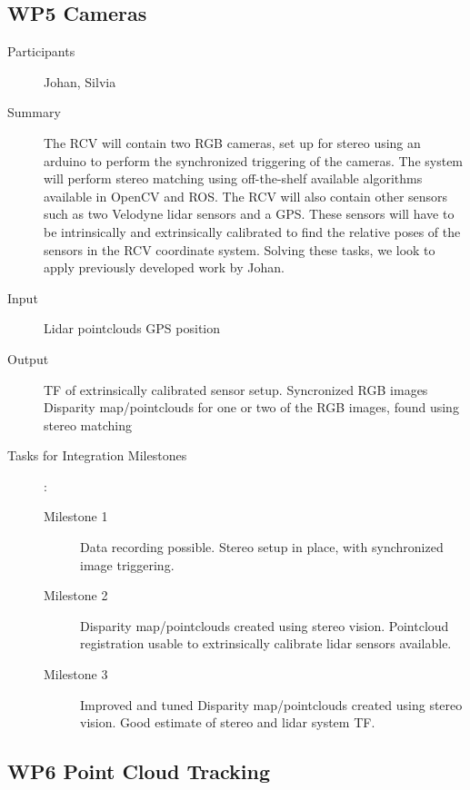 \documentclass[11pt,a4paper]{article}
\begin{document}
\subsection{WP5 Cameras} %
\begin{description}
\item[Participants] Johan, Silvia
\item[Summary]

The RCV will contain two RGB cameras, set up for stereo using an arduino to perform the synchronized triggering of the cameras. The system will perform stereo matching using off-the-shelf available algorithms available in OpenCV and ROS. The RCV will also contain other sensors such as two Velodyne lidar sensors and a GPS. These sensors will have to be intrinsically and extrinsically calibrated to find the relative poses of the sensors in the RCV coordinate system. Solving these tasks, we look to apply previously developed work by Johan. 

\item[Input]
	Lidar pointclouds
	GPS position
\item[Output]
	TF of extrinsically calibrated sensor setup.
	Syncronized RGB images
	Disparity map/pointclouds for one or two of the RGB images, found using stereo matching
\item[Tasks for Integration Milestones]:\
	\begin{description}
		\item[Milestone 1]
			Data recording possible.
			Stereo setup in place, with synchronized image triggering.
		\item[Milestone 2]
			Disparity map/pointclouds created using stereo vision.
			Pointcloud registration usable to extrinsically calibrate lidar sensors available.
		\item[Milestone 3]
			Improved and tuned Disparity map/pointclouds created using stereo vision.
			Good estimate of stereo and lidar system TF.
	\end{description}	 
\end{description}

\subsection{WP6 Point Cloud Tracking}
\end{document}

